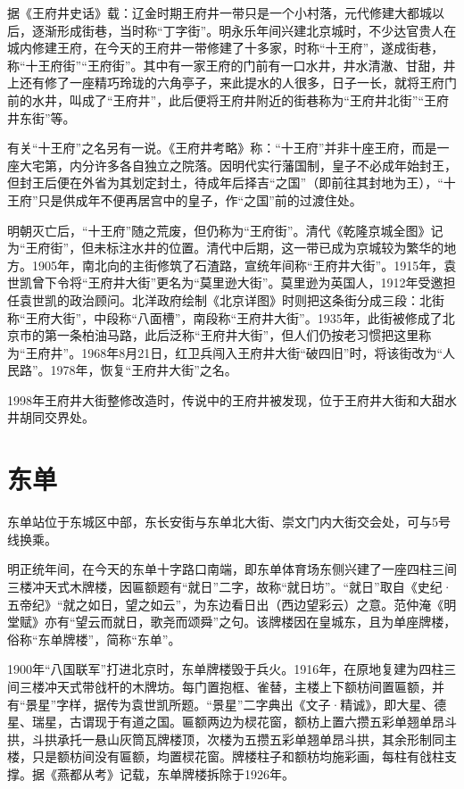 据《王府井史话》载：辽金时期王府井一带只是一个小村落，元代修建大都城以后，逐渐形成街巷，当时称“丁字街”。明永乐年间兴建北京城时，不少达官贵人在城内修建王府，在今天的王府井一带修建了十多家，时称“十王府”，遂成街巷，称“十王府街”“王府街”。其中有一家王府的门前有一口水井，井水清澈、甘甜，井上还有修了一座精巧玲珑的六角亭子，来此提水的人很多，日子一长，就将王府门前的水井，叫成了“王府井”，此后便将王府井附近的街巷称为“王府井北街”“王府井东街”等。

有关“十王府”之名另有一说。《王府井考略》称：“十王府”并非十座王府，而是一座大宅第，内分许多各自独立之院落。因明代实行藩国制，皇子不必成年始封王，但封王后便在外省为其划定封土，待成年后择吉“之国”（即前往其封地为王），“十王府”只是供成年不便再居宫中的皇子，作“之国”前的过渡住处。

明朝灭亡后，“十王府”随之荒废，但仍称为“王府街”。清代《乾隆京城全图》记为“王府街”，但未标注水井的位置。清代中后期，这一带已成为京城较为繁华的地方。1905年，南北向的主街修筑了石渣路，宣统年间称“王府井大街”。1915年，袁世凯曾下令将“王府井大街”更名为“莫里逊大街”。莫里逊为英国人，1912年受邀担任袁世凯的政治顾问。北洋政府绘制《北京详图》时则把这条街分成三段：北街称“王府大街”，中段称“八面槽”，南段称“王府井大街”。1935年，此街被修成了北京市的第一条柏油马路，此后泛称“王府井大街”，但人们仍按老习惯把这里称为“王府井”。1968年8月21日，红卫兵闯入王府井大街“破四旧”时，将该街改为“人民路”。1978年，恢复“王府井大街”之名。

1998年王府井大街整修改造时，传说中的王府井被发现，位于王府井大街和大甜水井胡同交界处。

\section{东单}
东单站位于东城区中部，东长安街与东单北大街、崇文门内大街交会处，可与5号线换乘。

明正统年间，在今天的东单十字路口南端，即东单体育场东侧兴建了一座四柱三间三楼冲天式木牌楼，因匾额题有“就日”二字，故称“就日坊”。“就日”取自《史纪·五帝纪》“就之如日，望之如云”，为东边看日出（西边望彩云）之意。范仲淹《明堂赋》亦有“望云而就日，歌尧而颂舜”之句。该牌楼因在皇城东，且为单座牌楼，俗称“东单牌楼”，简称“东单”。

1900年“八国联军”打进北京时，东单牌楼毁于兵火。1916年，在原地复建为四柱三间三楼冲天式带戗杆的木牌坊。每门置抱框、雀替，主楼上下额枋间置匾额，并有“景星”字样，据传为袁世凯所题。“景星”二字典出《文子·精诚》，即大星、德星、瑞星，古谓现于有道之国。匾额两边为棂花窗，额枋上置六攒五彩单翘单昂斗拱，斗拱承托一悬山灰筒瓦牌楼顶，次楼为五攒五彩单翘单昂斗拱，其余形制同主楼，只是额枋间没有匾额，均置棂花窗。牌楼柱子和额枋均施彩画，每柱有戗柱支撑。据《燕都从考》记载，东单牌楼拆除于1926年。

